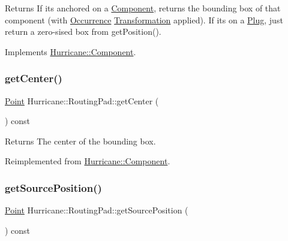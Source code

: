 \begin{DoxyReturn}{Returns}
If it\textquotesingle{}s anchored on a \hyperlink{classHurricane_1_1Component}{Component}, returns the bounding box of that component (with \hyperlink{classHurricane_1_1Occurrence}{Occurrence} \hyperlink{classHurricane_1_1Transformation}{Transformation} applied). If it\textquotesingle{}s on a \hyperlink{classHurricane_1_1Plug}{Plug}, just return a zero-\/sised box from get\+Position(). 
\end{DoxyReturn}


Implements \hyperlink{classHurricane_1_1Component}{Hurricane\+::\+Component}.

\mbox{\label{classHurricane_1_1RoutingPad_ad254b92749146a0eaaa7ed8f33fac4da}} 
\subsubsection{\texorpdfstring{get\+Center()}{getCenter()}}
{\footnotesize\ttfamily \hyperlink{classHurricane_1_1Point}{Point} Hurricane\+::\+Routing\+Pad\+::get\+Center (\begin{DoxyParamCaption}{ }\end{DoxyParamCaption}) const\hspace{0.3cm}{\ttfamily [virtual]}}

\begin{DoxyReturn}{Returns}
The center of the bounding box. 
\end{DoxyReturn}


Reimplemented from \hyperlink{classHurricane_1_1Component}{Hurricane\+::\+Component}.

\mbox{\label{classHurricane_1_1RoutingPad_acc706fecb615230387a73ed8a7384c8e}} 
\subsubsection{\texorpdfstring{get\+Source\+Position()}{getSourcePosition()}}
{\footnotesize\ttfamily \hyperlink{classHurricane_1_1Point}{Point} Hurricane\+::\+Routing\+Pad\+::get\+Source\+Position (\begin{DoxyParamCaption}{ }\end{DoxyParamCaption}) const}

